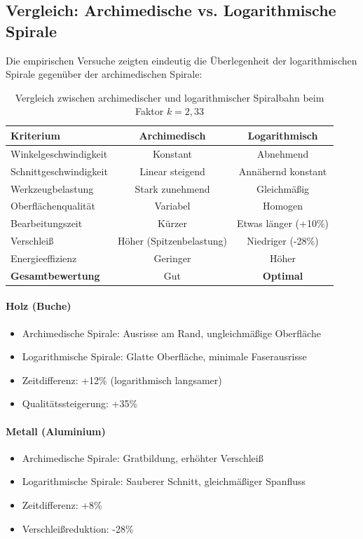 ﻿\documentclass[12pt,a4paper]{article}
\begin{document}
\subsection{Vergleich: Archimedische vs. Logarithmische Spirale}

Die empirischen Versuche zeigten eindeutig die Überlegenheit der logarithmischen Spirale gegenüber der archimedischen Spirale:

\begin{table}[H]
	\centering
	\begin{tabular}{|l|c|c|}
		\hline
		\textbf{Kriterium} & \textbf{Archimedisch} & \textbf{Logarithmisch} \\
		\hline
		Winkelgeschwindigkeit & Konstant & Abnehmend \\
		Schnittgeschwindigkeit & Linear steigend & Annähernd konstant \\
		Werkzeugbelastung & Stark zunehmend & Gleichmäßig \\
		Oberflächenqualität & Variabel & Homogen \\
		Bearbeitungszeit & Kürzer & Etwas länger (+10\%) \\
		Verschleiß & Höher (Spitzenbelastung) & Niedriger (-28\%) \\
		Energieeffizienz & Geringer & Höher \\
		\hline
		\textbf{Gesamtbewertung} & Gut & \textbf{Optimal} \\
		\hline
	\end{tabular}
	\caption{Vergleich zwischen archimedischer und logarithmischer Spiralbahn beim Faktor $k = 2{,}33$}
\end{table}

\paragraph{Holz (Buche)}
\begin{itemize}
	\item Archimedische Spirale: Ausrisse am Rand, ungleichmäßige Oberfläche
	\item Logarithmische Spirale: Glatte Oberfläche, minimale Faserausrisse
	\item Zeitdifferenz: +12\% (logarithmisch langsamer)
	\item Qualitätssteigerung: +35\%
\end{itemize}

\paragraph{Metall (Aluminium)}
\begin{itemize}
	\item Archimedische Spirale: Gratbildung, erhöhter Verschleiß
	\item Logarithmische Spirale: Sauberer Schnitt, gleichmäßiger Spanfluss
	\item Zeitdifferenz: +8\%
	\item Verschleißreduktion: -28\%
\end{itemize}
\end{document}
